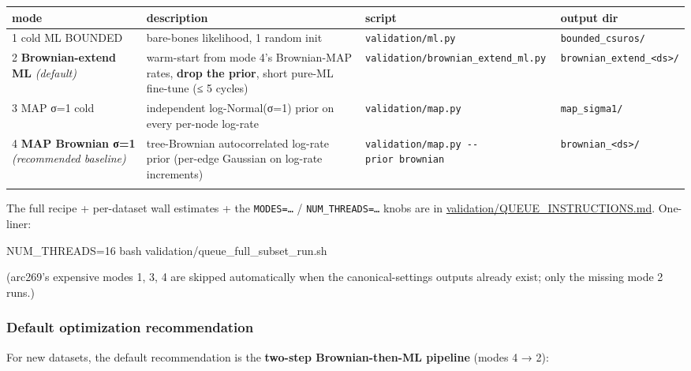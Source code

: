 \documentclass[
  10pt,
]{article}
\newenvironment{Shaded}{}{}
\newcommand{\FunctionTok}[1]{\textcolor[rgb]{0.02,0.16,0.49}{#1}}
\newcommand{\NormalTok}[1]{#1}
\newcommand{\OperatorTok}[1]{\textcolor[rgb]{0.40,0.40,0.40}{#1}}
\newcommand{\VariableTok}[1]{\textcolor[rgb]{0.10,0.09,0.49}{#1}}
\begin{document}
\begin{center}
\begin{adjustbox}{max width=\textwidth}
\begin{tabular}{@{}llll@{}}
\toprule\noalign{}
mode & description & script & output dir \\
\midrule\noalign{}
1 cold ML BOUNDED & bare-bones likelihood, 1 random init &
\texttt{validation/ml.py} & \texttt{bounded\_csuros/} \\
2 \textbf{Brownian-extend ML} \emph{(default)} & warm-start from mode
4's Brownian-MAP rates, \textbf{drop the prior}, short pure-ML fine-tune
(≤ 5 cycles) & \texttt{validation/brownian\_extend\_ml.py} &
\texttt{brownian\_extend\_\textless{}ds\textgreater{}/} \\
3 MAP σ=1 cold & independent log-Normal(σ=1) prior on every per-node
log-rate & \texttt{validation/map.py} & \texttt{map\_sigma1/} \\
4 \textbf{MAP Brownian σ=1} \emph{(recommended baseline)} &
tree-Brownian autocorrelated log-rate prior (per-edge Gaussian on
log-rate increments) & \texttt{validation/map.py\ -\/-prior\ brownian} &
\texttt{brownian\_\textless{}ds\textgreater{}/} \\
\bottomrule\noalign{}
\end{tabular}
\end{adjustbox}
\end{center}

The full recipe + per-dataset wall estimates + the \texttt{MODES=…} /
\texttt{NUM\_THREADS=…} knobs are in
\url{validation/QUEUE_INSTRUCTIONS.md}. One-liner:

\begin{Shaded}
\begin{Highlighting}[]
\VariableTok{NUM\_THREADS}\OperatorTok{=}\NormalTok{16 }\FunctionTok{bash}\NormalTok{ validation/queue\_full\_subset\_run.sh}
\end{Highlighting}
\end{Shaded}

(arc269's expensive modes 1, 3, 4 are skipped automatically when the
canonical-settings outputs already exist; only the missing mode 2 runs.)

\subsubsection{Default optimization
recommendation}\label{default-optimization-recommendation}

For new datasets, the default recommendation is the \textbf{two-step
Brownian-then-ML pipeline} (modes 4 → 2):
\end{document}

